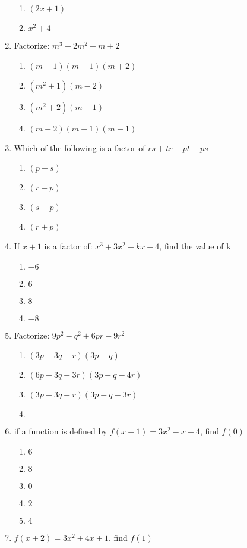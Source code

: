 \begin{multicols}{2}
\begin{enumerate}[label={\arabic*.}]
\begin{enumerate}[label={\Alph*.}]
	\item \((2x+1)\)
	\item \({x}^{2}+4\)
	\end{enumerate}
\item Factorize: \(m^3-2m^2-m+2\)
	\begin{enumerate}[label={\Alph*.}]
	\item \((m+1)(m+1)(m+2)\)
	\item \((m^2+1)(m-2)\)
	\item \((m^2+2)(m-1)\)
	\item \((m-2)(m+1)(m-1)\)
	\end{enumerate}
\item Which of the following is a factor of \(rs+tr-pt-ps\)
	\begin{enumerate}[label={\Alph*.}]
	\item \((p-s)\)
	\item \((r-p)\)
	\item \((s-p)\)
	\item \((r+p)\)
	\end{enumerate}
\item If \(x+1\) is a factor of: \({x}^{3}+3{x}^{2}+kx+4\), find the value of k
	\begin{enumerate}[label={\Alph*.}]
	\item \(-6\)
	\item \(6\)
	\item \(8\)
	\item \(-8\)
	\end{enumerate}
\item Factorize: \(9p^2-q^2+6pr-9r^2\)
	\begin{enumerate}[label={\Alph*.}]
	\item \((3p-3q+r)(3p-q)\)
	\item \((6p-3q-3r)(3p-q-4r)\)
	\item \((3p-3q+r)(3p-q-3r)\)
	\item \(\)
	\end{enumerate}
\item if a function is defined by $f(x+1) = 3x^2-x+4$, find $f(0)$
	\begin{enumerate}[label={\Alph*.}]
	\item \(6\)
	\item \(8\)
	\item \(0\)
	\item \(2\)
	\item \(4\)
	\end{enumerate}
\item $f(x+2) = 3x^2 + 4x + 1$. find $f(1)$

\end{enumerate}
\end{multicols}

